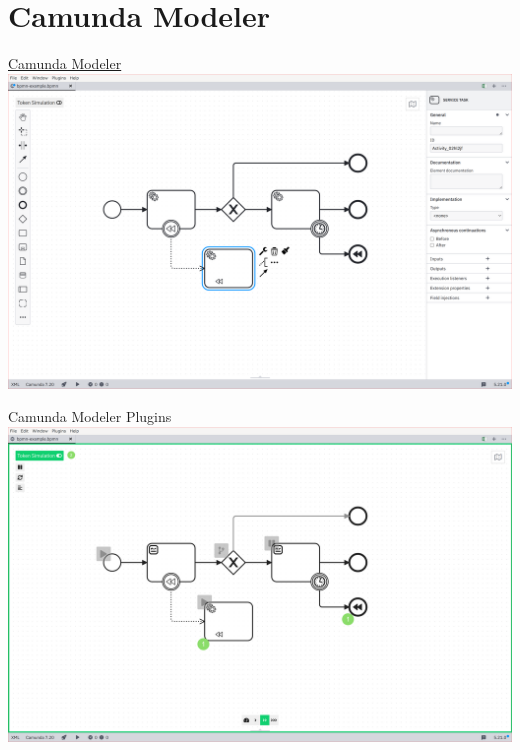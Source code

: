 \documentclass[12pt,aspectratio=169]{beamer}
\begin{document}

\section{Camunda Modeler}

\begin{frame}{\href{https://camunda.com/download/modeler/}{Camunda Modeler}}
\includegraphics[width=0.8\paperwidth]{images/camunda-modeler.png}
\end{frame}

\begin{frame}{Camunda Modeler Plugins}
\includegraphics[width=0.8\paperwidth]{images/token-simulation.png}
\end{frame}
\end{document}
